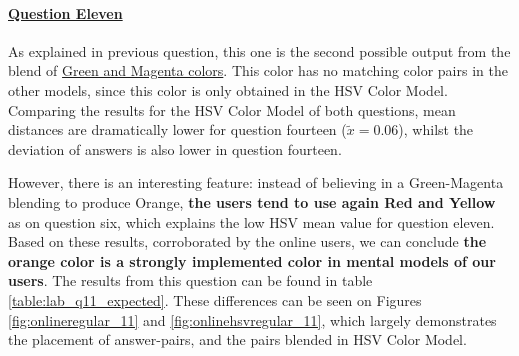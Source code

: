 \paragraph{\ul{Question Eleven}}
%
As explained in previous question, this one is the second possible output from the blend of \ul{Green and Magenta colors}. This color has no matching color pairs in the other models,
since this color is only obtained in the HSV Color Model. Comparing the results for the HSV Color Model of both questions, mean distances are dramatically lower for question fourteen
($\tilde{x} = 0.06$), whilst the deviation of answers is also lower in question fourteen. \par
%
However, there is an interesting feature: instead of believing in a Green-Magenta blending to produce Orange, \textbf{the users tend to use again Red and Yellow} as on question six,
which explains the low HSV mean value for question eleven.
%
Based on these results, corroborated by the online users, we can conclude \textbf{the orange color is a strongly implemented color in mental models of our users}. The results from
this question can be found in table \ref{table:lab_q11_expected}. These differences can be seen on Figures \ref{fig:onlineregular_11} and \ref{fig:onlinehsvregular_11}, which largely
demonstrates the placement of answer-pairs, and the pairs blended in HSV Color Model.
%

